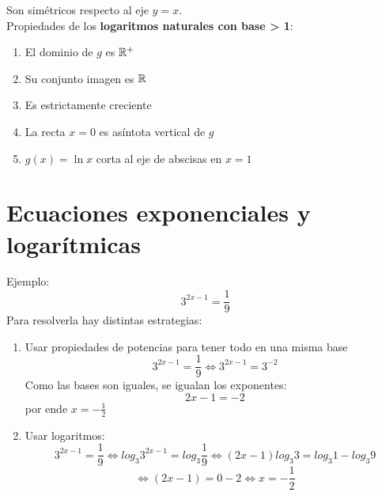 Son simétricos respecto al eje $y = x$.\\

Propiedades de los \textbf{logaritmos naturales con base > 1}:
\begin{enumerate}
    \item El dominio de $g$ es ${\mathbb{R}}^+$
    \item Su conjunto imagen es ${\mathbb{R}}$
    \item Es estrictamente creciente
    \item La recta $x = 0$ es asíntota vertical de $g$
    \item $g(x) = \ln x$ corta al eje de abscisas en $x = 1$ 
\end{enumerate}

\section{Ecuaciones exponenciales y logarítmicas}

Ejemplo: 
$$3^{2x-1} = \frac{1}{9}$$
Para resolverla hay distintas estrategias:
\begin{enumerate}
    \item {Usar propiedades de potencias para tener todo en una misma base
    $$3^{2x-1} = \frac{1}{9} \Leftrightarrow 3^{2x-1} = 3^{-2}$$
    Como las bases son iguales, se igualan los exponentes:
    $$2x-1 = -2$$
    por ende $x = -\frac{1}{2}$
    }
    \item {Usar logaritmos:
        $$3^{2x-1} = \frac{1}{9} \Leftrightarrow log_3 3^{2x-1} = log_3 \frac{1}{9} \Leftrightarrow (2x-1) log_3 3 = log_3 1 - log_3 9$$
        $$\Leftrightarrow (2x-1) = 0 - 2 \Leftrightarrow x = -\frac{1}{2}$$
    }
\end{enumerate}